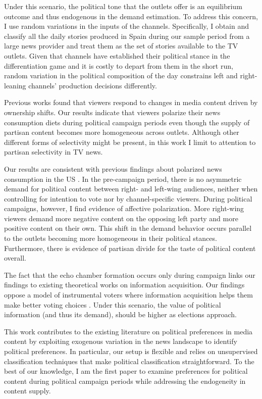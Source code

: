 \documentclass[12pt]{article}
\begin{document}
	Under this scenario, the political tone that the outlets offer is an equilibrium outcome and thus endogenous in the demand estimation. To address this concern, I use random variations in the inputs of the channels. Specifically, I obtain and classify all the daily stories produced in Spain during our sample period from a large news provider and treat them as the set of stories available to the TV outlets. Given that channels have established their political stance in the differentiation game and it is costly to depart from them in the short run, random variation in the political composition of the day constrains left and right-leaning channels' production decisions differently.
	
	
	
	Previous works \cite{durante2012partisan} found that viewers respond to changes in media content driven by ownership shifts. Our results indicate that viewers polarize their news consumption diets during political campaign periods even though the supply of partisan content becomes more homogeneous across outlets.  Although other different forms of selectivity might be present, in this work I limit to attention to partisan selectivity in TV news. 
	
	Our results are consistent with previous findings about polarized news consumption in the US \citep{Peterson2017Echo}. In the pre-campaign period, there is no asymmetric demand for political content between right- and left-wing audiences, neither when controlling for intention to vote nor by channel-specific viewers. During political campaigns, however, I find evidence of affective polarization. More right-wing viewers demand more negative content on the opposing left party and more positive content on their own. This shift in the demand behavior occurs parallel to the outlets becoming more homogeneous in their political stances. Furthermore, there is evidence of partisan divide for the taste of political content overall.
	
	The fact that the echo chamber formation occurs only during campaign links our findings to existing theoretical works on information acquisition. Our findings oppose a model of instrumental voters where information acquisition helps them make better voting choices \citep{larcinese2003}. Under this scenario, the value of political information (and thus its demand), should be higher as elections approach. 
	
	
	
	This work contributes to the existing literature on political preferences in media content by exploiting exogenous variation in the news landscape to identify political preferences. In particular, our setup is flexible and relies on unsupervised classification techniques that make political classification straightforward. To the best of our knowledge, I am the first paper to examine preferences for political content during political campaign periods while addressing the endogeneity in content supply.
	
\end{document}
